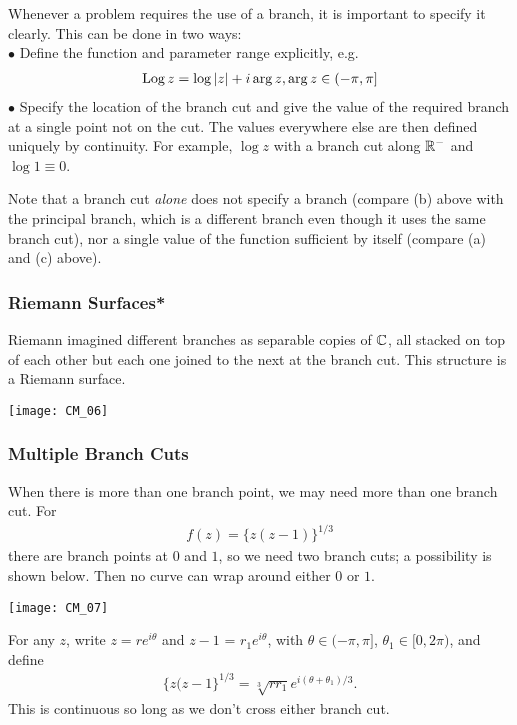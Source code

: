 \documentclass[a4paper]{article}
\begin{document}
Whenever a problem requires the use of a branch, it is important to specify it clearly. This can be done in two ways:\\
$\bullet$ Define the function and parameter range explicitly, e.g.
\begin{equation*}
\begin{aligned}
\operatorname{Log} z = \log|z| + i\arg z, \arg z \in (-\pi,\pi]
\end{aligned}
\end{equation*}
$\bullet$ Specify the location of the branch cut and give the value of the required branch at a single point not on the cut. The values everywhere else are then defined uniquely by continuity. For example, $\log z$ with a branch cut along $\mathbb{R}^-$ and $\log 1 \equiv 0$.

Note that a branch cut \emph{alone} does not specify a branch (compare (b) above with the principal branch, which is a different branch even though it uses the same branch cut), nor a single value of the function sufficient by itself (compare (a) and (c) above).

\subsubsection{Riemann Surfaces*}
Riemann imagined different branches as separable copies of $\mathbb{C}$, all stacked on top of each other but each one joined to the next at the branch cut. This structure is a Riemann surface.

\texttt{[image: CM\_06]}

\subsubsection{Multiple Branch Cuts}
When there is more than one branch point, we may need more than one branch cut. For
\begin{equation*}
\begin{aligned}
f(z) = \{z(z-1) \}^{1/3}
\end{aligned}
\end{equation*}
there are branch points at $0$ and $1$, so we need two branch cuts; a possibility is shown below. Then no curve can wrap around either $0$ or $1$.

\texttt{[image: CM\_07]}

For any $z$, write $z = re^{i \theta}$ and $z-1$ = $r_1 e^{i\theta}$, with $\theta \in (-\pi,\pi]$, $\theta_1 \in [0,2\pi)$, and define
\begin{equation*}
\begin{aligned}
\{ z(z-1\}^{1/3} = \sqrt[3]{rr_1} e^{i(\theta+\theta_1)/3}.
\end{aligned}
\end{equation*}
This is continuous so long as we don't cross either branch cut.
\end{document}
